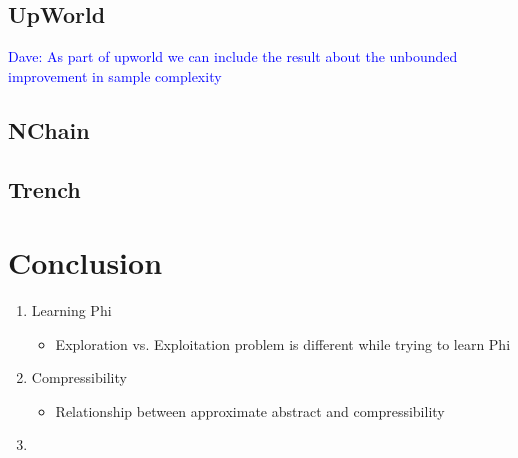 \documentclass[11pt]{article}
\newcommand\dnote[1]{\textcolor{blue}{Dave: #1}}
\begin{document}
\subsection{UpWorld}

\dnote{As part of upworld we can include the result about the unbounded improvement in sample complexity}




\subsection{NChain}




\subsection{Trench}





\section{Conclusion}


\begin{enumerate}
\item Learning Phi
\begin{itemize}
\item Exploration vs. Exploitation problem is different while trying to learn Phi
\end{itemize}
\item Compressibility
\begin{itemize}
\item Relationship between approximate abstract and compressibility
\end{itemize}
\item 
\end{enumerate}







\end{document}
